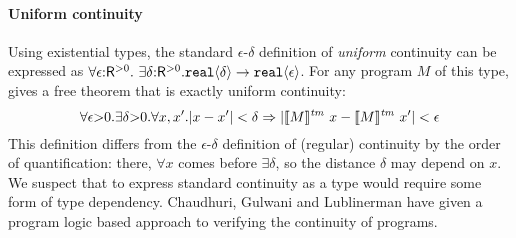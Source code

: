 \paragraph{Uniform continuity}
Using %
existential types, %
the standard $\epsilon$-$\delta$ definition of
\emph{uniform} continuity can be expressed as %
$  \forall \epsilon \mathord: \mathsf{R}^{>0}.\ \exists \delta\mathord: \mathsf{R}^{>0}.\\ \textup{\texttt{real}}\langle \delta \rangle \to \textup{\texttt{real}}\langle \epsilon \rangle$.
For any program $M$ of this type, %
 gives a free theorem that is exactly 
uniform continuity:
\begin{displaymath}
  \forall \epsilon \mathord> 0. \exists \delta \mathord> 0. \forall x,x'. |x - x'| < \delta \Rightarrow |\llbracket M \rrbracket^{\mathit{tm}}\ x - \llbracket M \rrbracket^{\mathit{tm}}\ x'| < \epsilon
\end{displaymath}
This definition differs from the $\epsilon$-$\delta$ definition of
(regular) continuity by the order of quantification:
there, $\forall x$ comes before $\exists \delta$, so the distance
$\delta$ may depend on %
$x$. We suspect that to express standard continuity as a type would
require some form of type dependency. Chaudhuri, Gulwani and
Lublinerman \cite{chaudhuri10continuity} have given a program logic
based approach to verifying the continuity of programs.












